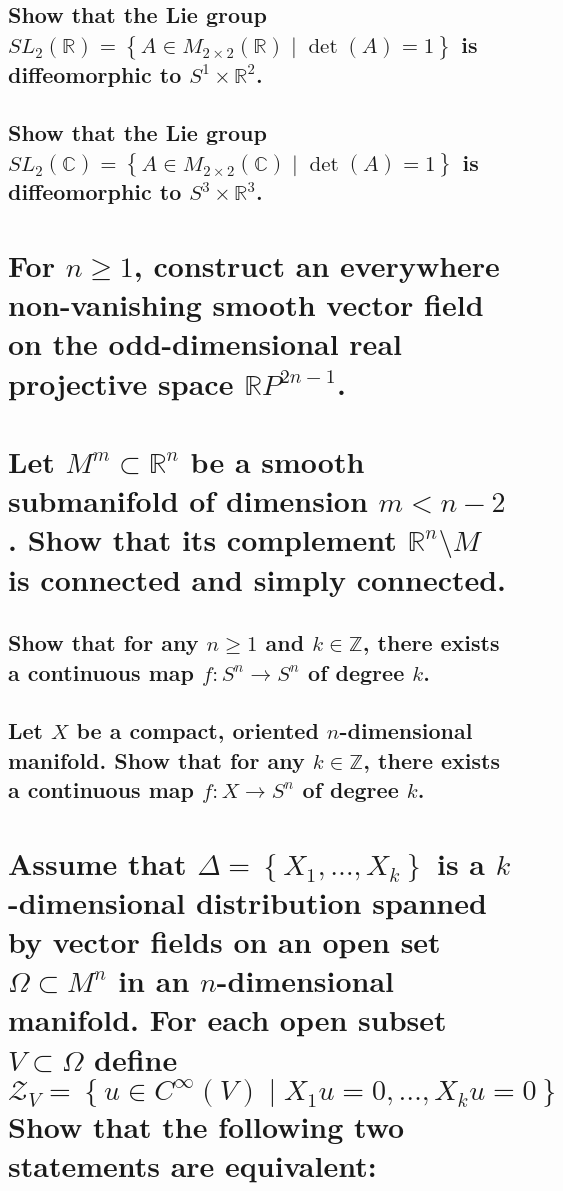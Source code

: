 \documentclass[10pt]{article}
\begin{document}
 

\advsection{}

\subsection{Show that the Lie group $SL_2(\mathbb{R}) = \left\{ A \in M_{2 \times2}(\mathbb{R})
    \mid\det (A) = 1 \right\} $ is diffeomorphic to $S^1 \times \mathbb{R}^2$.}

\subsection{Show that the Lie group $SL_2(\mathbb{C}) = \left\{ A \in M_{2 \times 2} (\mathbb{C})
    \mid \det (A)= 1 \right\} $ is diffeomorphic to $S^3 \times \mathbb{R}^3$.}

\section{For $n \geq 1 $, construct an everywhere non-vanishing smooth vector field on the
  odd-dimensional real projective space $\mathbb{R} P^{2n-1}$.}

\section{Let $M^m \subset \mathbb{R}^n$ be a smooth submanifold of dimension $m < n-2$. Show that
  its complement $\mathbb{R}^n \setminus M$ is connected and simply connected.}

\advsection{}

\subsection{Show that for any $n \geq 1$ and $k \in \mathbb{Z}$, there exists a continuous map $f:
  S^n \to S^n$ of degree $k$.}

\subsection{Let $X$ be a compact, oriented $n$-dimensional manifold. Show that for any $k \in \mathbb{Z}$, there
  exists a continuous map $f : X \to S^n$ of degree $k$.}

\section{Assume that $\Delta = \left\{ X_1, \dots, X_k \right\} $ is a $k$-dimensional distribution
  spanned by vector fields on an open set $\Omega \subset M^n$ in an $n$-dimensional manifold. For
  each open subset $V \subset \Omega$ define
  $$ \mathcal{Z}_V = \left\{ u \in C^\infty (V) \mid X_1 u = 0, \dots, X_k u =0 \right\} $$
  Show that the following two statements are equivalent:}
\end{document}
